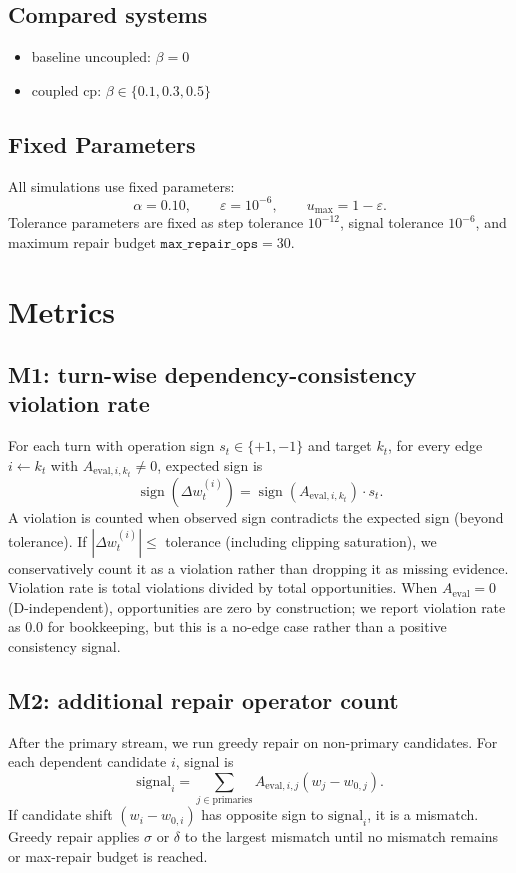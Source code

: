 \documentclass[11pt,a4paper]{article}
\begin{document}
\subsection{Compared systems}
\begin{itemize}
  \item baseline uncoupled: \(\beta=0\)
  \item coupled cp: \(\beta\in\{0.1,0.3,0.5\}\)
\end{itemize}

\subsection{Fixed Parameters}
All simulations use fixed parameters:
\[
\alpha=0.10,\qquad \varepsilon=10^{-6},\qquad u_{\max}=1-\varepsilon.
\]
Tolerance parameters are fixed as step tolerance \(10^{-12}\), signal tolerance \(10^{-6}\), and maximum repair budget \(\texttt{max\_repair\_ops}=30\).

\section{Metrics}
\label{sec:metrics}
\subsection{M1: turn-wise dependency-consistency violation rate}
For each turn with operation sign \(s_t\in\{+1,-1\}\) and target \(k_t\), for every edge \(i\leftarrow k_t\) with \(A_{\text{eval},i,k_t}\neq 0\), expected sign is
\[
\operatorname{sign}(\Delta w_t^{(i)}) = \operatorname{sign}(A_{\text{eval},i,k_t})\cdot s_t.
\]
A violation is counted when observed sign contradicts the expected sign (beyond tolerance). If \(|\Delta w_t^{(i)}|\le\) tolerance (including clipping saturation), we conservatively count it as a violation rather than dropping it as missing evidence.
Violation rate is total violations divided by total opportunities.
When \(A_{\text{eval}}=0\) (D-independent), opportunities are zero by construction; we report violation rate as 0.0 for bookkeeping, but this is a no-edge case rather than a positive consistency signal.

\subsection{M2: additional repair operator count}
After the primary stream, we run greedy repair on non-primary candidates.
For each dependent candidate \(i\), signal is
\[
\text{signal}_i = \sum_{j\in\text{primaries}} A_{\text{eval},i,j}(w_j-w_{0,j}).
\]
If candidate shift \((w_i-w_{0,i})\) has opposite sign to \(\text{signal}_i\), it is a mismatch.
Greedy repair applies \(\sigma\) or \(\delta\) to the largest mismatch until no mismatch remains or max-repair budget is reached.
\end{document}
